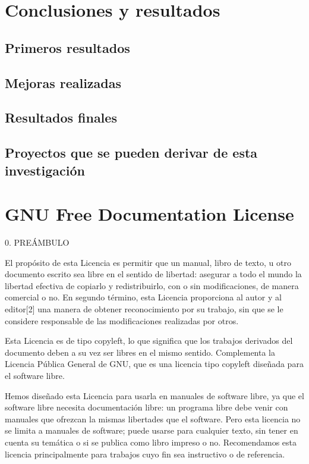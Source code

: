 \documentclass[a4paper, 11pt, oneside]{report}
\begin{document}
\chapter{Conclusiones y resultados}

\section{Primeros resultados}

\section{Mejoras realizadas}

\section{Resultados finales}

\section{Proyectos que se pueden derivar de esta investigación}

\chapter{GNU Free Documentation License}

0. PREÁMBULO

El propósito de esta Licencia es permitir que un manual, libro de texto, u otro documento escrito sea libre en el sentido de libertad: asegurar a todo el mundo la libertad efectiva de copiarlo y redistribuirlo, con o sin modificaciones, de manera comercial o no. En segundo término, esta Licencia proporciona al autor y al editor[2] una manera de obtener reconocimiento por su trabajo, sin que se le considere responsable de las modificaciones realizadas por otros.

Esta Licencia es de tipo copyleft, lo que significa que los trabajos derivados del documento deben a su vez ser libres en el mismo sentido. Complementa la Licencia Pública General de GNU, que es una licencia tipo copyleft diseñada para el software libre.

Hemos diseñado esta Licencia para usarla en manuales de software libre, ya que el software libre necesita documentación libre: un programa libre debe venir con manuales que ofrezcan la mismas libertades que el software. Pero esta licencia no se limita a manuales de software; puede usarse para cualquier texto, sin tener en cuenta su temática o si se publica como libro impreso o no. Recomendamos esta licencia principalmente para trabajos cuyo fin sea instructivo o de referencia.
\end{document}
